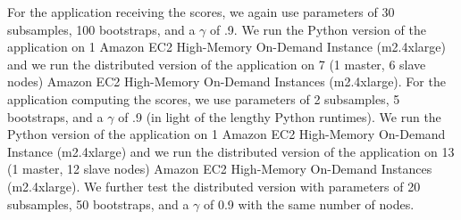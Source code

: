 For the application receiving the scores, we again use parameters of 30 subsamples, 100 bootstraps, and a $\gamma$ of .9. 
We run the Python version of the application on 1 Amazon EC2 \cite{ec2} High-Memory On-Demand Instance (m2.4xlarge) and we run the distributed version of the application on 7 (1 master, 6 slave nodes) Amazon EC2 High-Memory On-Demand Instances (m2.4xlarge). 
For the application computing the scores, we use parameters of 2 subsamples, 5 bootstraps, and a $\gamma$ of .9 (in light of the lengthy Python runtimes). 
We run the Python version of the application on 1 Amazon EC2 \cite{ec2} High-Memory On-Demand Instance (m2.4xlarge) and we run the distributed version of the application on 13 (1 master, 12 slave nodes) Amazon EC2 High-Memory On-Demand Instances (m2.4xlarge). We further test the distributed version with parameters of 20 subsamples, 50	bootstraps, and a $\gamma$ of 0.9 with the same number of nodes. 




